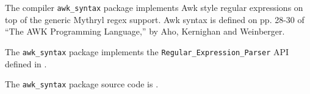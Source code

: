 The compiler {\tt awk\_syntax} package implements Awk style regular expressions 
on top of the generic Mythryl regex support.  Awk 
syntax is defined on pp. 28-30 of ``The AWK Programming Language,'' 
by Aho, Kernighan and Weinberger.

The {\tt awk\_syntax} package implements the {\tt Regular\_Expression\_Parser} API defined in 
.

The {\tt awk\_syntax} package source code is .



